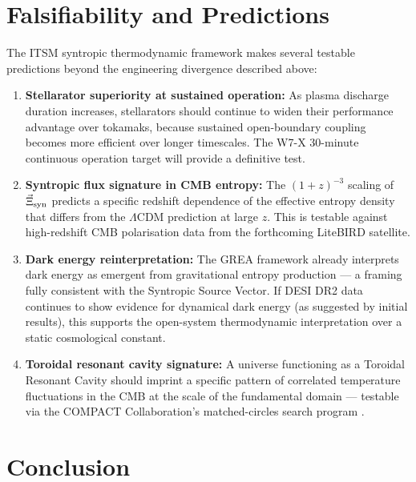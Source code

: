 \documentclass[aps,prd,11pt,onecolumn,superscriptaddress,nofootinbib,floatfix]{revtex4-2}
\begin{document}
\section{Falsifiability and Predictions}
\label{sec:predictions}

The ITSM syntropic thermodynamic framework makes several testable predictions beyond the engineering divergence described above:

\begin{enumerate}

\item \textbf{Stellarator superiority at sustained operation:} As plasma discharge duration increases, stellarators should continue to widen their performance advantage over tokamaks, because sustained open-boundary coupling becomes more efficient over longer timescales. The W7-X 30-minute continuous operation target will provide a definitive test.

\item \textbf{Syntropic flux signature in CMB entropy:} The $(1+z)^{-3}$ scaling of $\vec{\Xi}_{\rm syn}$ predicts a specific redshift dependence of the effective entropy density that differs from the $\Lambda$CDM prediction at large $z$. This is testable against high-redshift CMB polarisation data from the forthcoming LiteBIRD satellite.

\item \textbf{Dark energy reinterpretation:} The GREA framework \cite{grea_2024} already interprets dark energy as emergent from gravitational entropy production --- a framing fully consistent with the Syntropic Source Vector. If DESI DR2 data continues to show evidence for dynamical dark energy (as suggested by initial results), this supports the open-system thermodynamic interpretation over a static cosmological constant.

\item \textbf{Toroidal resonant cavity signature:} A universe functioning as a Toroidal Resonant Cavity should imprint a specific pattern of correlated temperature fluctuations in the CMB at the scale of the fundamental domain --- testable via the COMPACT Collaboration's matched-circles search program \cite{compact_promise}.

\end{enumerate}

\section{Conclusion}
\label{sec:conclusion}
\end{document}
